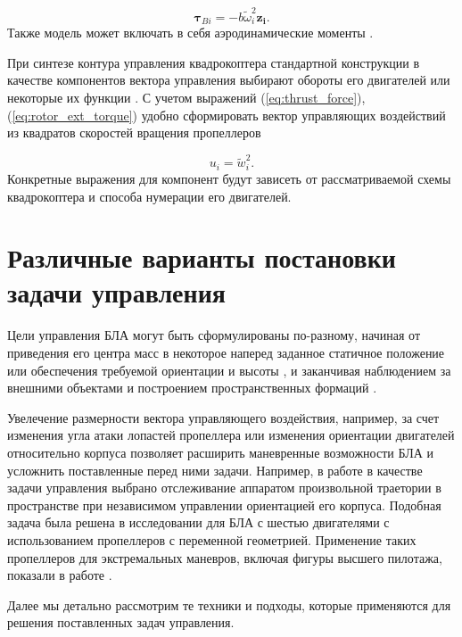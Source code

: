 \begin{equation} \label{eq:rotor_ext_torque}
\bm{\tau}_{Bi} = -b \tilde{\omega}^2_i \bm{z_i}.
\end{equation}
Также модель может включать в себя аэродинамические моменты \cite{Solovev01}.

При синтезе контура управления квадрокоптера стандартной конструкции в качестве компонентов вектора управления выбирают обороты его двигателей или некоторые их функции \cite{Sharifi01, Luukkonen01, Bemporad01}.  С учетом выражений (\ref{eq:thrust_force}), (\ref{eq:rotor_ext_torque}) удобно сформировать вектор управляющих воздействий из квадратов скоростей вращения пропеллеров

\begin{equation} \label{eq:common_control_vector}
u_i = \tilde{w}_i^2.
\end{equation}
Конкретные выражения для компонент будут зависеть от рассматриваемой схемы квадрокоптера и способа нумерации его двигателей.
 
\section{Различные варианты постановки задачи управления}
Цели управления БЛА могут быть сформулированы по-разному,
начиная от приведения его центра масс в некоторое наперед заданное статичное положение
\cite{Huynh01, Yuskin01}
или обеспечения требуемой ориентации и высоты
\cite{Domingos01, Wang01, Gheorghita01, Lukmana01, Zabko01},
и заканчивая наблюдением за внешними объектами
\cite{Rodriguez01, Kendall01, Razinkova01}
и построением пространственных формаций
\cite{Ali01, Zhao01, Preiss01}.
 
Увелечение размерности вектора управляющего воздействия, например, за счет изменения угла атаки лопастей пропеллера \cite{Cutler01, Cutler02}  или изменения ориентации двигателей относительно корпуса \cite{Sridhar02, Kumar02} позволяет расширить маневренные возможности БЛА и усложнить поставленные перед ними задачи. Например, в работе \cite{Ryll02} в качестве задачи управления выбрано отслеживание аппаратом произвольной траетории в пространстве при независимом управлении ориентацией его корпуса. Подобная задача была решена в исследовании \cite{Kaufman01} для БЛА с шестью двигателями с использованием пропеллеров с переменной геометрией. Применение таких пропеллеров для экстремальных маневров, включая фигуры высшего пилотажа, показали в работе \cite{Cutler02}.
 
Далее мы детально рассмотрим те техники и подходы, которые применяются для решения поставленных задач управления. 

